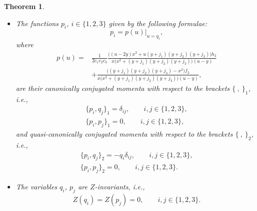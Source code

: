 \documentclass[pdftex]{sigma}
\def\d{\delta}
\numberwithin{equation}{section}
\newtheorem{Theorem}{Theorem}[section]
\begin{document}
\begin{Theorem}
\begin{itemize}
\item[$(ii)$] The functions $p_i$, $i \in \{1,2,3\}$ given by the following formulae:
\begin{equation}\label{pi}
 p_i=p(u)|_{u=q_i},
 \end{equation}
 where
\begin{align}
p(u)= {}&
\frac{1}{2 c_1 c_2 c_3 }\frac{\big((u-2y) x^2+u(y+j_1)(y+j_2)(y+j_3)\big) h_2}{x\big(x^2+(y+j_1)(y+j_2)(y+j_3)\big)(u-y)}\nonumber\\
&+\frac{\big((y+j_1)(y+j_2)(y+j_3)-x^2\big) f_2}{x\big(x^2+(y+j_1)(y+j_2)(y+j_3)\big)(u-y)},\label{pu}
\end{align}
are their canonically conjugated momenta with respect to the brackets $\{ \ ,\ \}_1$, i.e.,
\begin{subequations} \label{qcanon1}
\begin{gather}
 \{p_i,q_j\}_1= \d_{ij}, \qquad i, j\in \{1,2,3\},
\\
\{p_i,p_j\}_1=0, \qquad i, j\in \{1,2,3\},
\end{gather}
\end{subequations}
and quasi-canonically conjugated momenta with respect to the brackets $\{ \ ,\ \}_2$, i.e.,
\begin{subequations}\label{qcanon2}
\begin{gather}
 \{p_i,q_j\}_2=-q_i \d_{ij}, \qquad i, j\in \{1,2,3\},
\\
\{p_i,p_j\}_2=0, \qquad i, j\in \{1,2,3\}.
\end{gather}
\end{subequations}
\item[$(iii)$] The variables $q_i$, $p_j$ are $Z$-invariants, i.e.,
\begin{equation}\label{qpinv}
Z(q_i)=Z(p_j)=0, \qquad i,j \in \{1,2,3\}.
\end{equation}
\end{itemize}
\end{Theorem}
\end{document}
